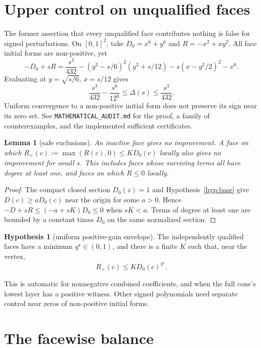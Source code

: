 \documentclass[11pt]{article}
\newtheorem{lemma}[theorem]{Lemma}
\theoremstyle{definition}
\newtheorem{hypothesis}{Hypothesis}
\theoremstyle{remark}
\begin{document}
\section{Upper control on unqualified faces}

The former assertion that every unqualified face contributes nothing is
false for signed perturbations. On $[0,1]^2$, take $D_0=x^6+y^6$ and
$R=-x^2+xy^2$. All face initial forms are non-positive, yet
\[
 -D_0+sR=\frac{s^3}{432}
 -(y^2-s/6)^2(y^2+s/12)-s(x-y^2/2)^2-x^6.
\]
Evaluating at $y=\sqrt{s/6}$, $x=s/12$ gives
\[
 \frac{s^3}{432}-\frac{s^6}{12^6}\le\Delta(s)\le\frac{s^3}{432}.
\]
Uniform convergence to a non-positive initial form does not preserve its
sign near its zero set. See \texttt{MATHEMATICAL\_AUDIT.md} for the proof,
a family of counterexamples, and the implemented sufficient certificates.

\begin{lemma}[safe exclusions]\label{lem:inadmissible}
An inactive face gives no improvement. A face on which
$R_+(c):=\max(R(c),0)\le K D_0(c)$ locally also gives no improvement for
small $s$. This includes faces whose surviving terms all have degree at
least one, and faces on which $R\le0$ locally.
\end{lemma}
\begin{proof}
The compact closed section $D_0(z)=1$ and Hypothesis~\ref{hyp:base}
give $D(c)\ge aD_0(c)$ near the origin for some $a>0$. Hence
$-D+sR\le(-a+sK)D_0\le0$ when $sK<a$. Terms of degree at least one
are bounded by a constant times $D_0$ on the same normalized section.
\end{proof}

\begin{hypothesis}[uniform positive-gain envelope]\label{hyp:envelope}
The independently qualified faces have a minimum $q^\star\in(0,1)$,
and there is a finite $K$ such that, near the vertex,
\[
 R_+(c)\le K D_0(c)^{q^\star}.
\]
\end{hypothesis}
This is automatic for nonnegative combined coefficients, and when the
full cone's lowest layer has a positive witness. Other signed polynomials
need separate control near zeros of non-positive initial forms.

\section{The facewise balance}\label{sec:balance}
\end{document}
